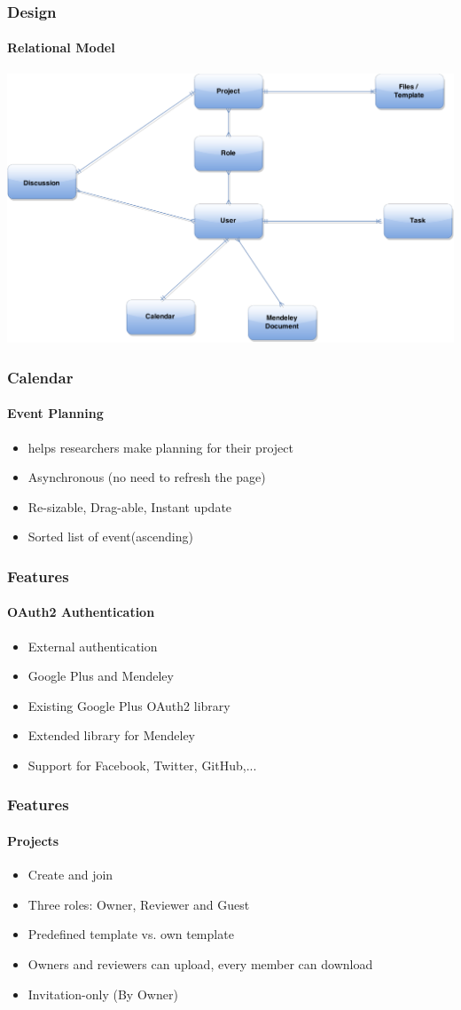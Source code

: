 \documentclass{beamer}
\begin{document}
\begin{frame}
\frametitle{Design}\framesubtitle{Relational Model}
\centering
\includegraphics[scale=0.2]{./images/RMA.png}
\end{frame}

\begin{frame}
\frametitle{Calendar}\framesubtitle{Event Planning}
	\begin{itemize}
		\item helps researchers make planning for their project 
		\item Asynchronous (no need to refresh the page)
		\item Re-sizable, Drag-able, Instant update
		\item Sorted list of event(ascending) 
	\end{itemize}
\end{frame}


\begin{frame}
\frametitle{Features}
\framesubtitle{OAuth2 Authentication}
	\begin{itemize}
		\item External authentication
		\item Google Plus and Mendeley
		\item Existing Google Plus OAuth2 library
		\item Extended library for Mendeley
		\item Support for Facebook, Twitter, GitHub,...
	\end{itemize}
\end{frame}

\begin{frame}
\frametitle{Features}
\framesubtitle{Projects}
	\begin{itemize}
		\item Create and join
		\item Three roles: Owner, Reviewer and Guest
		\item Predefined template vs. own template
		\item Owners and reviewers can upload, every member can download
		\item Invitation-only (By Owner)
	\end{itemize}
\end{frame}
\end{document}
